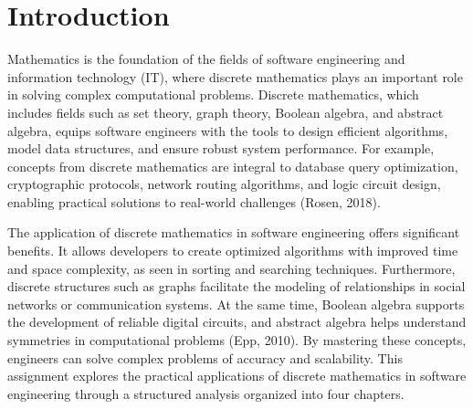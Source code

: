 \documentclass[12pt, a4paper]{report} %
\begin{document}


\tableofcontents 

\newpage


\section*{Introduction}
Mathematics is the foundation of the fields of software engineering and information technology (IT), where discrete mathematics plays an important role in solving complex computational problems. Discrete mathematics, which includes fields such as set theory, graph theory, Boolean algebra, and abstract algebra, equips software engineers with the tools to design efficient algorithms, model data structures, and ensure robust system performance. For example, concepts from discrete mathematics are integral to database query optimization, cryptographic protocols, network routing algorithms, and logic circuit design, enabling practical solutions to real-world challenges (Rosen, 2018).

The application of discrete mathematics in software engineering offers significant benefits. It allows developers to create optimized algorithms with improved time and space complexity, as seen in sorting and searching techniques. Furthermore, discrete structures such as graphs facilitate the modeling of relationships in social networks or communication systems. At the same time, Boolean algebra supports the development of reliable digital circuits, and abstract algebra helps understand symmetries in computational problems (Epp, 2010). By mastering these concepts, engineers can solve complex problems of accuracy and scalability. This assignment explores the practical applications of discrete mathematics in software engineering through a structured analysis organized into four chapters.

\end{document}
